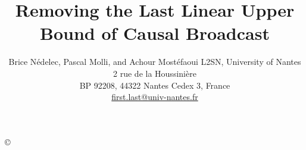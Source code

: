 \documentclass{class-for-drafts}
\begin{document}
 

\title{Removing the Last Linear Upper Bound of Causal Broadcast}



\newcommand{\affLSNN}{L2SN, University of Nantes\\
  2 rue de la Houssini{\`e}re\\
  BP 92208, 44322 Nantes Cedex 3, France\\
  \url{first.last@univ-nantes.fr}}


\author{Brice N{\'e}delec, Pascal Molli, and Achour Most{\'e}faoui \aff \affLSNN}



\proceedings{}

\copyright{}

\maketitle













  
\end{document}
